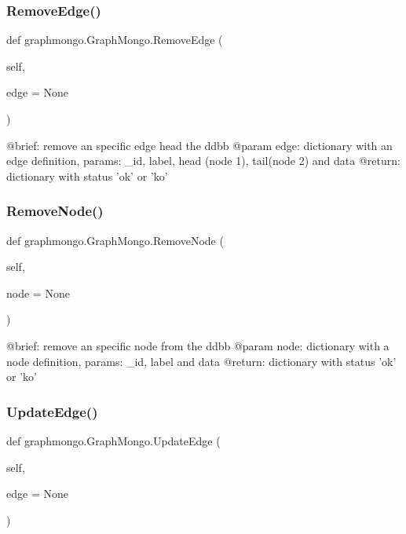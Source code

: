 \subsubsection{\texorpdfstring{Remove\+Edge()}{RemoveEdge()}}
{\footnotesize\ttfamily def graphmongo.\+Graph\+Mongo.\+Remove\+Edge (\begin{DoxyParamCaption}\item[{}]{self,  }\item[{}]{edge = {\ttfamily None} }\end{DoxyParamCaption})}

\begin{DoxyVerb}@brief: remove an specific edge head the ddbb
@param edge: dictionary with an edge definition, params: _id, label, head (node 1), tail(node 2) and data
@return: dictionary with status 'ok' or 'ko'
\end{DoxyVerb}
 \hypertarget{classgraphmongo_1_1GraphMongo_a3461c57941092ca2f34b253896594fc1}{}\label{classgraphmongo_1_1GraphMongo_a3461c57941092ca2f34b253896594fc1} 
\subsubsection{\texorpdfstring{Remove\+Node()}{RemoveNode()}}
{\footnotesize\ttfamily def graphmongo.\+Graph\+Mongo.\+Remove\+Node (\begin{DoxyParamCaption}\item[{}]{self,  }\item[{}]{node = {\ttfamily None} }\end{DoxyParamCaption})}

\begin{DoxyVerb}@brief: remove an specific node from the ddbb
@param node: dictionary with a node definition, params: _id, label and data
@return: dictionary with status 'ok' or 'ko' 
\end{DoxyVerb}
 \hypertarget{classgraphmongo_1_1GraphMongo_a316443d72fac9aac57b3b3e74be96960}{}\label{classgraphmongo_1_1GraphMongo_a316443d72fac9aac57b3b3e74be96960} 
\subsubsection{\texorpdfstring{Update\+Edge()}{UpdateEdge()}}
{\footnotesize\ttfamily def graphmongo.\+Graph\+Mongo.\+Update\+Edge (\begin{DoxyParamCaption}\item[{}]{self,  }\item[{}]{edge = {\ttfamily None} }\end{DoxyParamCaption})}

